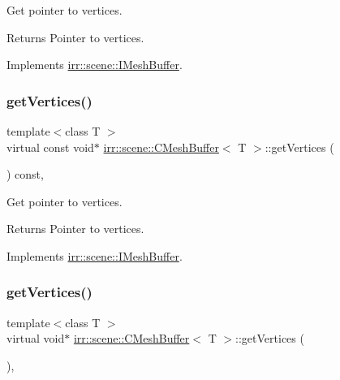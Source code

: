 Get pointer to vertices. 

\begin{DoxyReturn}{Returns}
Pointer to vertices. 
\end{DoxyReturn}


Implements \hyperlink{classirr_1_1scene_1_1IMeshBuffer_a99891e516246b2cff13b362a435c8028}{irr\+::scene\+::\+I\+Mesh\+Buffer}.

\mbox{\label{classirr_1_1scene_1_1CMeshBuffer_ad9463b97ee94bbc26bbb11bf867ea830}} 
\subsubsection{\texorpdfstring{get\+Vertices()}{getVertices()}\hspace{0.1cm}{\footnotesize\ttfamily [2/4]}}
{\footnotesize\ttfamily template$<$class T $>$ \\
virtual const void$\ast$ \hyperlink{classirr_1_1scene_1_1CMeshBuffer}{irr\+::scene\+::\+C\+Mesh\+Buffer}$<$ T $>$\+::get\+Vertices (\begin{DoxyParamCaption}{ }\end{DoxyParamCaption}) const\hspace{0.3cm}{\ttfamily [inline]}, {\ttfamily [virtual]}}



Get pointer to vertices. 

\begin{DoxyReturn}{Returns}
Pointer to vertices. 
\end{DoxyReturn}


Implements \hyperlink{classirr_1_1scene_1_1IMeshBuffer_a99891e516246b2cff13b362a435c8028}{irr\+::scene\+::\+I\+Mesh\+Buffer}.

\mbox{\label{classirr_1_1scene_1_1CMeshBuffer_a9173c9d0c6f32890ab75dc501aaf5be6}} 
\subsubsection{\texorpdfstring{get\+Vertices()}{getVertices()}\hspace{0.1cm}{\footnotesize\ttfamily [3/4]}}
{\footnotesize\ttfamily template$<$class T $>$ \\
virtual void$\ast$ \hyperlink{classirr_1_1scene_1_1CMeshBuffer}{irr\+::scene\+::\+C\+Mesh\+Buffer}$<$ T $>$\+::get\+Vertices (\begin{DoxyParamCaption}{ }\end{DoxyParamCaption})\hspace{0.3cm}{\ttfamily [inline]}, {\ttfamily [virtual]}}



